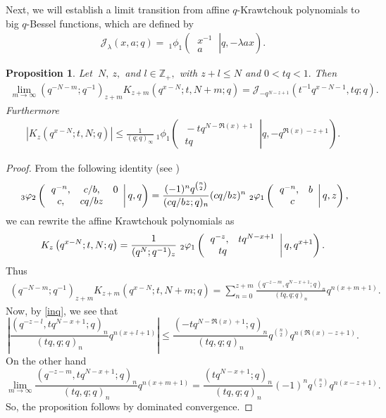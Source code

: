 \documentclass[12pt,a4paper]{amsart}
\numberwithin{equation}{section}
\theoremstyle{plain}
\newtheorem{proposition}[theorem]{Proposition}
\theoremstyle{definition}
\theoremstyle{remark}
\numberwithin{equation}{section}
\numberwithin{table}{section}
\numberwithin{figure}{section}
\begin{document}
Next, we will establish a limit transition from affine
$q$-Krawtchouk polynomials to big $q$-Bessel functions, which are
defined by
\begin{align*}
\mathcal{J}_{\lambda}(x,a;q)=\ _{1}\phi_{1}\left( \left. \begin{matrix} \ x^{-1}\  \\
\ a\end{matrix}\right\vert q,-\lambda a x \right).
\end{align*}
\begin{proposition}Let $\ N, \ z,$ and $ l\in \mathbb{Z}_+,$ with $z+l\leq
N$ and $0<tq<1.$ Then
\begin{align*}
\lim_{m\rightarrow
\infty}(q^{-N-m};q^{-1})_{z+m}K_{z+m}(q^{x-N};t,N+m;q)=\mathcal{J}_{-q^{N-z+1}}(t^{-1}q^{x-N-1},tq;q).
\end{align*}
Furthermore
\begin{align*}
|K_{z}(q^{x-N};t,N;q)|\leq\frac{1}{(q;q)_{\infty}} \ _{1}\phi_{1}\left( \left. \begin{matrix} \ -tq^{N-\Re(x)+1}\  \\
\ tq\end{matrix}\right\vert q,-q^{\Re(x)-z+1} \right).
\end{align*}
\end{proposition}
\begin{proof}
From the following identity (see \cite{GR})
\[ \ _{3}\varphi_{ 2}\left(  \left.
\begin{array}
[c]{ccc}q^{-n}, & c/b, & 0\\
c, & cq/bz &
\end{array}
\right\vert q,q\right)
=\frac{(-1)^nq^{\binom{n}{2}}}{(cq/bz;q)_n}(cq/bz)^n \
_{2}\varphi_{1}\left( \left.
\begin{array}
[c]{ccc}q^{-n},& b\\
\,\,\,\, c&
\end{array}
\right\vert q,z\right),
\]
we can rewrite the affine Krawtchouk polynomials as
$$K_{z}\left(  q^{x-N};t,N;q\right)=\frac{1}{(q^{N};q^{-1})_z}\ _{2}\varphi_{1}\left( \left.
\begin{array}
[c]{ccc}q^{-z}, & tq^{N-x+1}\\
\, \, \ tq &
\end{array}
\right\vert q,q^{x+1}\right).$$ Thus
\begin{align*}
(q^{-N-m};q^{-1})_{z+m}K_{z+m}(q^{x-N};t,N+m;q)=
\sum_{n=0}^{z+m}\frac{(q^{-z-m},q^{N-x+1};q)_n}{(tq,q;q)_n}q^{n(x+m+1)}.
\end{align*}
Now, by \eqref{inq}, we see that
\begin{equation}
|\frac{(q^{-z-l},tq^{N-x+1};q)_n}{(tq,q;q)_n}q^{n(x+l+1)}|\leq
\frac{(-tq^{N-\Re(x)+1};q)_n}{(tq,q;q)_n}q^{\binom{n}{2}}q^{n(\Re(x)-z+1)}.
\end{equation}
On the other hand
\begin{equation}
\lim_{m\rightarrow\infty}\frac{(q^{-z-m},tq^{N-x+1};q)_n}{(tq,q;q)_n}q^{n(x+m+1)}=\frac{(tq^{N-x+1};q)_n}{(tq,q;q)_n}(-1)^nq^{\binom{n}{2}}q^{n(x-z+1)}.
\end{equation}
So, the proposition follows by dominated convergence.
\end{proof}
\end{document}
